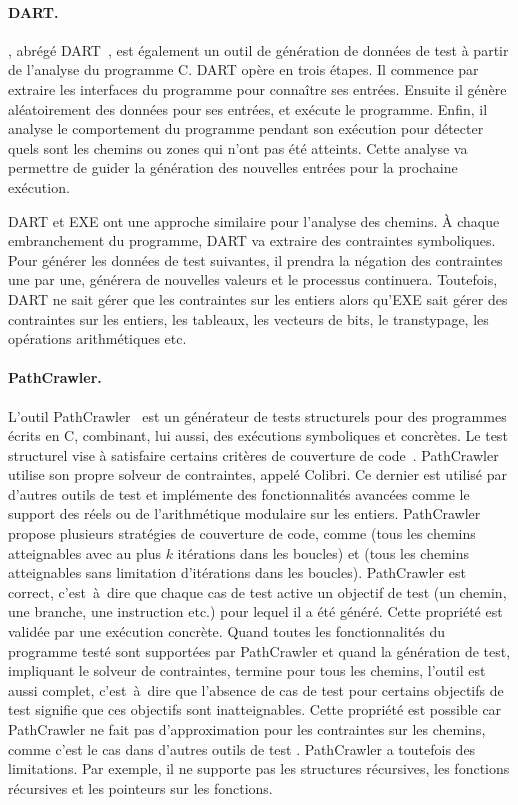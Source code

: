 \paragraph{DART.} , abrégé
DART~, est également un outil de génération de données de
test à partir de l'analyse du programme C. DART opère en trois étapes. Il
commence par extraire les interfaces du programme pour connaître ses entrées.
Ensuite il génère aléatoirement des données pour ses entrées, et exécute le
programme. Enfin, il analyse le comportement du programme pendant son exécution
pour détecter quels sont les chemins ou zones qui n'ont pas été atteints. Cette
analyse va permettre de guider la génération des nouvelles entrées pour la
prochaine exécution.

DART et EXE ont une approche similaire pour l'analyse des chemins. À chaque
embranchement du programme, DART va extraire des contraintes symboliques. Pour
générer les données de test suivantes, il prendra la négation des contraintes
une par une, générera de nouvelles valeurs et le processus continuera.
Toutefois, DART ne sait gérer que les contraintes sur les entiers alors qu'EXE
sait gérer des contraintes sur les entiers, les tableaux, les vecteurs de bits,
le transtypage, les opérations arithmétiques etc.

\paragraph{PathCrawler.} L'outil PathCrawler~ est un générateur de tests structurels pour des programmes
écrits en C, combinant, lui aussi, des exécutions symboliques et concrètes. Le
test structurel vise à satisfaire certains critères de couverture de
code~.  PathCrawler utilise son propre
solveur de contraintes, appelé Colibri. Ce dernier est utilisé par d'autres
outils de test et implémente des fonctionnalités avancées comme le support des
réels ou de l'arithmétique modulaire sur les entiers. PathCrawler propose
plusieurs stratégies de couverture de code, comme 
(tous les chemins atteignables avec au plus $k$ itérations dans les boucles) et
 (tous les chemins atteignables sans limitation
d'itérations dans les boucles). PathCrawler est correct, c'est~à~dire que chaque
cas de test active un objectif de test (un chemin, une branche, une instruction
etc.) pour lequel il a été généré. Cette propriété est validée par une exécution
concrète. Quand toutes les fonctionnalités du programme testé sont supportées
par PathCrawler et quand la génération de test, impliquant le solveur de
contraintes, termine pour tous les chemins, l'outil est aussi complet,
c'est~à~dire que l'absence de cas de test pour certains objectifs de test
signifie que ces objectifs sont inatteignables. Cette propriété est possible car
PathCrawler ne fait pas d'approximation pour les contraintes sur les chemins,
comme c'est le cas dans d'autres outils de test .
PathCrawler a toutefois des limitations. Par exemple, il ne supporte pas les
structures récursives, les fonctions récursives et les pointeurs sur les
fonctions. \\

